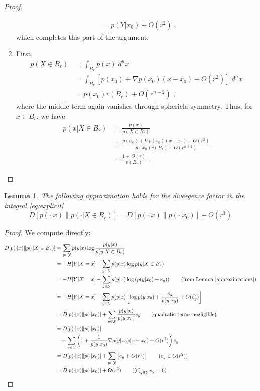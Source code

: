 \documentclass[english]{scrartcl}
\newtheorem{lm}{Lemma}
\begin{document}
\begin{proof}
\begin{enumerate}[label=(\alph*)]
\begin{align}
					&= p(Y|x_0) + O(r^2)\;,
				\end{align}
			which completes this part of the argument. 
			\item First, 
				\begin{align}
					p(X \in B_r) &= \int_{B_r} p(x) \; d^nx  \\
					&= \int_{B_r} \left[p(x_0) + \nabla p(x_0)(x - x_0) + O(r^2)\right] \; d^nx \\ 
					&= p(x_0) v(B_r) + O(r^{n+2})\;,
				\end{align}
				where the middle term again vanishes through sphericla symmetry. Thus, for $x \in B_r$, we have
				\begin{align}
					p(x | X \in B_r) &= \frac{p(x)}{p(X \in B_r)} \\
					&= \frac{p(x_0) + \nabla p(x_0)(x - x_0) + O(r^2)}{p(x_0) v(B_r) + O(r^{n+2})} \\
					&= \frac{1 + O(r)}{v(B_r)}\;.
				\end{align}
		\end{enumerate}
	\end{proof}

	\begin{lm} The following approximation holds for the divergence factor in the integral \eqref{eq:explicit}
		\begin{equation}
			D[p(\cdot|x)\| p(\cdot|X \in B_r)] = D[p(\cdot|x)\| p(\cdot|x_0)] + O(r^{3})
		\end{equation}
	\end{lm}
	\begin{proof}
		We compute directly: 
		\begin{align}
			D[p(\cdot|x)\| p(\cdot|X \in B_r)] &= \sum_{y \in \mathcal{Y}} p(y|x) \log \frac{p(y|x)}{p(y|X \in B_r)} \\
			&= - H[Y|X = x] - \sum_{y \in \mathcal{Y}} p(y|x) \log p(y|X \in B_r) \\
			&= - H[Y|X = x] - \sum_{y \in \mathcal{Y}} p(y|x) \log \left(p(y|x_0) + e_y)\right) \tag{from Lemma \ref{approximations}}\\
			&= - H[Y|X = x] - \sum_{y \in \mathcal{Y}} p(y|x) \left[\log p(y|x_0) + \frac{e_y}{p(y|x_0)} + O(e_y^2)\right] \\
			&= D[p(\cdot|x)\| p(\cdot|x_0)] + \sum_{y \in \mathcal{Y}} \frac{p(y|x)}{p(y|x_0)}  e_y \tag{quadratic terms negligible} \\
			&=D[p(\cdot|x)\| p(\cdot|x_0)] \\
			&\quad + \sum_{y \in \mathcal{Y}} \left(1 + \frac{1}{p(y|x_0)} \nabla p(y|x_0)(x - x_0) + O(r^{2})\right)    e_y \\
			&= D[p(\cdot|x)\| p(\cdot|x_0)] + \sum_{y \in \mathcal{Y}} \left[e_y + O(r^{3})\right] \tag{$e_y \in O(r^2)$}\\
			&= D[p(\cdot|x)\| p(\cdot|x_0)] + O(r^3) \tag{$\sum_{y \in \mathcal{Y}} e_y = 0$}
		\end{align}
	\end{proof}
\end{document}
